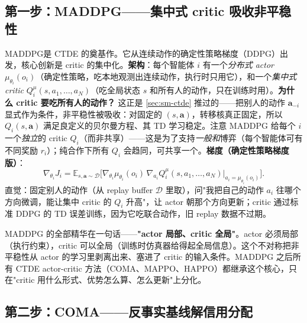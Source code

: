 \subsection{第一步：MADDPG——集中式 critic 吸收非平稳性}

MADDPG\cite{lowe2017maddpg}是 CTDE 的奠基作。它从连续动作的确定性策略梯度（DDPG）出发，核心创新是 critic 的集中化。\textbf{架构}：每个智能体 $i$ 有一个\emph{分布式 actor} $\mu_{\theta_i}(o_i)$（确定性策略，吃本地观测出连续动作，执行时只用它），和一个\emph{集中式 critic} $Q_i^\mu(s,a_1,\dots,a_N)$（吃全局状态 $s$ 和所有人的动作，只在训练时用）。\textbf{为什么 critic 要吃所有人的动作？} 这正是 \cref{sec:sm-ctde} 推过的——把别人的动作 $\mathbf{a}_{-i}$ 显式作为条件，非平稳性被吸收：对固定的 $(s,\mathbf{a})$，转移核真正固定，所以 $Q_i(s,\mathbf{a})$ 满足良定义的贝尔曼方程、其 TD 学习稳定。注意 MADDPG 给每个 $i$ 一个\emph{独立}的 critic $Q_i$（而非共享）——这是为了支持\emph{一般和}博弈（每个智能体可有不同奖励 $r_i$）；纯合作下所有 $Q_i$ 会趋同，可共享一个。\textbf{梯度（确定性策略梯度版）}：
\begin{equation}
  \nabla_{\theta_i}J_i=\mathbb{E}_{s,\mathbf{a}\sim\mathcal{D}}\Big[\nabla_{\theta_i}\mu_{\theta_i}(o_i)\,\nabla_{a_i}Q_i^\mu(s,a_1,\dots,a_N)\big|_{a_i=\mu_{\theta_i}(o_i)}\Big].
  \label{eq:sm-maddpg}
\end{equation}
直觉：固定别人的动作（从 replay buffer $\mathcal{D}$ 里取），问"我把自己的动作 $a_i$ 往哪个方向微调，能让集中 critic 的 $Q_i$ 升高"，让 actor 朝那个方向更新；critic 通过标准 DDPG 的 TD 误差训练，因为它吃联合动作，旧 replay 数据不过期。

\begin{insight}
MADDPG 的全部精华在一句话——\textbf{"actor 局部、critic 全局"}。actor 必须局部（执行约束），critic 可以全局（训练时仿真器给得起全局信息）。这个不对称把非平稳性从 actor 的学习里剥离出来、塞进了 critic 的输入条件。MADDPG 之后所有 CTDE actor-critic 方法（COMA、MAPPO、HAPPO）都继承这个核心，只在"critic 用什么形式、优势怎么算、怎么更新"上分化。
\end{insight}

\subsection{第二步：COMA——反事实基线解信用分配}

